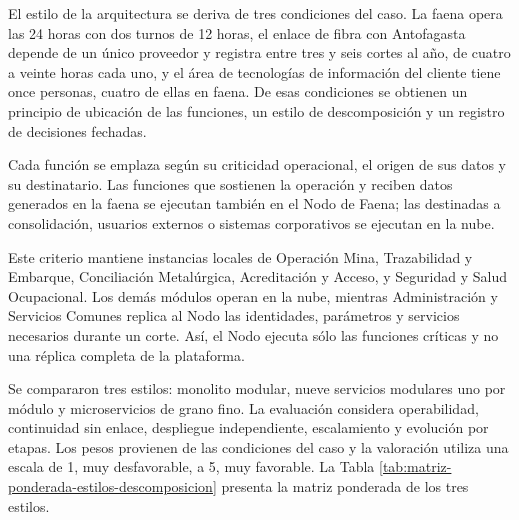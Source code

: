\documentclass[subdoc]{../../comun/overfore}
\begin{document}
El estilo de la arquitectura se deriva de tres condiciones del caso. La faena opera las 24 horas con dos turnos de 12 horas, el enlace de fibra con Antofagasta depende de un único proveedor y registra entre tres y seis cortes al año, de cuatro a veinte horas cada uno, y el área de tecnologías de información del cliente tiene once personas, cuatro de ellas en faena. De esas condiciones se obtienen un principio de ubicación de las funciones, un estilo de descomposición y un registro de decisiones fechadas.

Cada función se emplaza según su criticidad operacional, el origen de sus datos y su destinatario. Las funciones que sostienen la operación y reciben datos generados en la faena se ejecutan también en el Nodo de Faena; las destinadas a consolidación, usuarios externos o sistemas corporativos se ejecutan en la nube.

Este criterio mantiene instancias locales de Operación Mina, Trazabilidad y Embarque, Conciliación Metalúrgica, Acreditación y Acceso, y Seguridad y Salud Ocupacional. Los demás módulos operan en la nube, mientras Administración y Servicios Comunes replica al Nodo las identidades, parámetros y servicios necesarios durante un corte. Así, el Nodo ejecuta sólo las funciones críticas y no una réplica completa de la plataforma.

Se compararon tres estilos: monolito modular, nueve servicios modulares uno por módulo y microservicios de grano fino. La evaluación considera operabilidad, continuidad sin enlace, despliegue independiente, escalamiento y evolución por etapas. Los pesos provienen de las condiciones del caso y la valoración utiliza una escala de 1, muy desfavorable, a 5, muy favorable. La Tabla \ref{tab:matriz-ponderada-estilos-descomposicion} presenta la matriz ponderada de los tres estilos.
\end{document}
